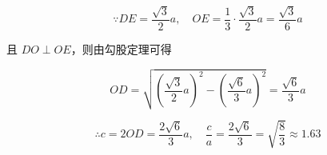 \begin{equation*}
    \because DE = \frac{\sqrt{3}}{2} a, \quad OE = \frac{1}{3} \cdot \frac{\sqrt{3}}{2} a = \frac{\sqrt{3}}{6} a
\end{equation*}

且 $DO \perp OE$，则由勾股定理可得

\begin{equation*}
    OD = \sqrt{\left(\frac{\sqrt{3}}{2}a\right)^2-\left(\frac{\sqrt{6}}{3}a\right)^2} = \frac{\sqrt{6}}{3} a
\end{equation*}

\begin{equation*}
    \therefore c = 2 OD = \frac{2\sqrt{6}}{3} a, \quad \frac{c}{a} = \frac{2\sqrt{6}}{3} = \sqrt{\frac{8}{3}} \approx 1.63
\end{equation*}

